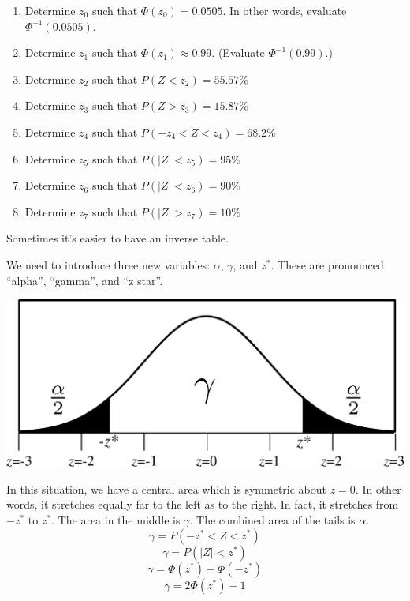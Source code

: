 \documentclass[12pt,letterpaper]{article}
\begin{document}
\begin{enumerate}[resume]
\item Determine $z_0$ such that $\Phi(z_0)=0.0505$. In other words, evaluate $\Phi^{-1}(0.0505)$.
\vfill
\item Determine $z_1$ such that $\Phi(z_1)\approx 0.99$. (Evaluate $\Phi^{-1}(0.99)$.)
\vfill
\item Determine $z_2$ such that $P(Z < z_2) = 55.57\%$
\vfill
\item Determine $z_3$ such that $P(Z > z_3) = 15.87\%$
\vfill
\item Determine $z_4$ such that $P(-z_4 < Z < z_4) = 68.2\%$
\vfill
\item Determine $z_5$ such that $P(|Z| < z_5) = 95\%$
\vfill
\item Determine $z_6$ such that $P(|Z| < z_6) = 90\%$
\vfill
\item Determine $z_7$ such that $P(|Z| > z_7) = 10\%$
\vfill
\end{enumerate}

\newpage

Sometimes it's easier to have an inverse table.
{ \footnotesize
\begin{multicols}{5}

\end{multicols}
}


\newpage
We need to introduce three new variables: $\alpha$, $\gamma$, and $z^*$. These are pronounced ``alpha'', ``gamma'', and ``z star''.

\begin{center}
\includegraphics[scale=1]{alphagamma.png}
\end{center}

In this situation, we have a central area which is symmetric about $z=0$. In other words, it stretches equally far to the left as to the right. In fact, it stretches from $-z^*$ to $z^*$. The area in the middle is $\gamma$. The combined area of the tails is $\alpha$.
$$\gamma = P(-z^* < Z < z^*)$$
$$\gamma = P(|Z| < z^*)$$
$$\gamma = \Phi(z^*)-\Phi(-z^*) $$
$$\gamma = 2\Phi(z^*)-1 $$
\end{document}
